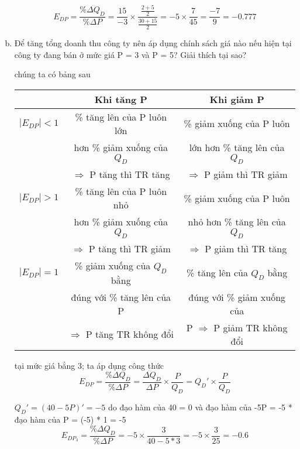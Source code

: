 \begin{enumerate}[a.]
        \[ E_{DP} = \frac{\%\Delta Q_D}{\%\Delta P} =
          \frac{15}{-3}  \times
          \frac{\frac{2 + 5}{2}}{\frac{30 + 15}{2}} =
          -5  \times
          \frac{7}{45} = \frac{-7}{9} = -0.777
        \]



  \item Để tăng tổng doanh thu công ty nên áp dụng chính sách giá nào nếu hiện tại công ty
        đang bán ở mức giá P = 3 và P = 5? Giải thích tại sao?

        chúng ta có bảng sau

        \begin{tabular}{ |c|c|c| }
          \hline
                         & \textbf{Khi tăng P}               & \textbf{Khi giảm P}                 \\
          \hline
          $|E_{DP}| < 1$ & \% tăng lên của P luôn lớn        & \% giảm xuống của P luôn            \\
                         & hơn \% giảm xuống của $Q_D$       & lớn hơn \% tăng lên của $Q_D$       \\
                         & $\Rightarrow$ P tăng thì TR tăng  & $\Rightarrow$ P giảm thì TR giảm    \\
          \hline
          $|E_{DP}| > 1$ & \% tăng lên của P luôn nhỏ        & \% giảm xuống của P luôn            \\
                         & hơn \% giảm xuống của $Q_D$       & nhỏ hơn \% tăng lên của $Q_D$       \\
                         & $\Rightarrow$ P tăng thì TR giảm  & $\Rightarrow$ P giảm thì TR tăng    \\
          \hline
          $|E_{DP}| = 1$ & \% giảm xuống của $Q_D$ bằng      & \% tăng lên của $Q_D$ bằng          \\
                         & đúng với \% tăng lên của P        & đúng với \% giảm xuống của          \\
                         & $\Rightarrow$ P tăng TR không đổi & P $\Rightarrow$ P giảm TR không đổi \\
          \hline
        \end{tabular}


        tại mức giá bẳng 3;
        ta áp dụng công thức
        \[ E_{DP} = \frac{\%\Delta Q_D}{\%\Delta P} =
          \frac{\Delta Q_D}{\Delta P} \times \frac{P}{Q_D} = Q_D' \times \frac{P}{Q_D} \]

        $Q_D' = ( 40 - 5P)' = -5$
        do đạo hàm của 40 = 0 và đạo hàm của -5P = -5 * đạo hàm của P = (-5) * 1 = -5
        \[ E_{DP_3} = \frac{\%\Delta Q_D}{\%\Delta P} = -5 \times \frac{3}{40 - 5 * 3}
          = -5 \times \frac{3}{25} = -0.6 \]


\end{enumerate}
